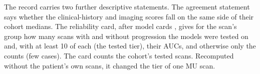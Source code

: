 The record carries two further descriptive statements. The agreement statement says whether the clinical-history and
imaging scores fall on the same side of their cohort medians. The reliability card, after model cards
\citep{mitchell2019}, gives for the scan's group how many scans with and without progression the models were tested
on and, with at least 10 of each (the tested tier), their AUCs, and otherwise only the counts (few cases). The card
counts the cohort's tested scans. Recomputed without the patient's own scans, it changed the tier of one MU scan.

